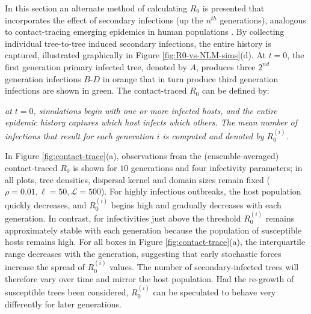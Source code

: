 In this section an alternate method of calculating $R_0$ is presented that incorporates the effect of secondary infections  
(up the $n^{th}$ generations), analogous to contact-tracing emerging epidemics in human populations \cite{eames2003contact}.
By collecting individual tree-to-tree induced secondary infections, the entire history is captured, illustrated graphically in Figure \ref{fig:R0-vs-NLM-sims}(d).
At $t=0$, the first generation primary infected tree, denoted by $A$, produces three $2^{nd}$ generation infections $B$-$D$ in orange that in turn produce
third generation infections are shown in green.
The contact-traced $R_0$ can be defined by:

\begin{defn} %
\label{def:R0_contact_traced}
\textit{at $t=0$, simulations begin with one or more infected hosts, and the entire epidemic history captures which host infects which others.
The mean number of infections that result for each generation $i$ is computed and denoted by $R^{(i)}_0$.}
\end{defn}

In Figure \ref{fig:contact-trace}(a), observations from the (ensemble-averaged) contact-traced $R_0$ is shown for $10$ generations and 
four infectivity parameters; in all plots, tree densities, dispersal kernel and domain sizes remain fixed ($\rho=0.01, \ell=50, \mathcal{L}=500$).
For highly infectious outbreaks, the host population quickly decreases, and $R^{(i)}_0$ begins high and gradually decreases with each generation.
In contrast, for infectivities just above the threshold $R^{(i)}_0$ remains approximately stable with each generation because the population of susceptible hosts remains high.  
For all boxes in Figure \ref{fig:contact-trace}(a), the interquartile range decreases with the generation, suggesting that early stochastic forces increase the spread of $R^{(i)}_0$ values.
The number of secondary-infected trees will therefore vary over time and mirror the host population.
Had the re-growth of susceptible trees been considered, $R^{(i)}_0$ can be speculated to behave very differently for later generations.


